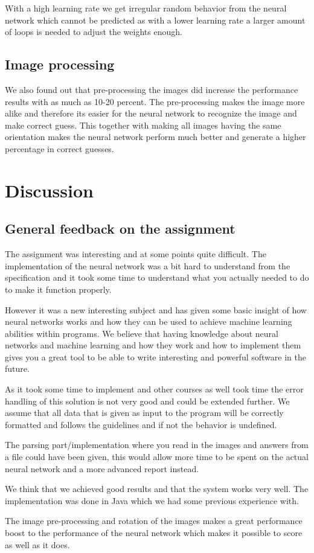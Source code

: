 \documentclass[a4paper, 12pt]{article}
\begin{document}
With a high learning rate we get irregular random behavior from the neural network which cannot be predicted as with a lower learning rate a larger amount of loops is needed to adjust the weights enough.

\subsection{Image processing}
We also found out that pre-processing the images did increase the performance results with as much as 10-20 percent. The pre-processing makes the image more alike and therefore its easier for the neural network to recognize the image and make correct guess. This together with making all images having the same orientation makes the neural network perform much better and generate a higher percentage in correct guesses.

\section{Discussion}
\subsection{General feedback on the assignment}
The assignment was interesting and at some points quite difficult. The implementation of the neural network was a bit hard to understand from the specification and it took some time to understand what you actually needed to do to make it function properly.

However it was a new interesting subject and has given some basic insight of how neural networks works and how they can be used to achieve machine learning abilities within programs. We believe that having knowledge about neural networks and machine learning and how they work and how to implement them gives you a great tool to be able to write interesting and powerful software in the future.

As it took some time to implement and other courses as well took time the error handling of this solution is not very good and could be extended further. We assume that all data that is given as input to the program will be correctly formatted and follows the guidelines and if not the behavior is undefined.

The parsing part/implementation where you read in the images and answers from a file could have been given, this would allow more time to be spent on the actual neural network and a more advanced report instead.

We think that we achieved good results and that the system works very well. The implementation was done in Java which we had some previous experience with.

The image pre-processing and rotation of the images makes a great performance boost to the performance of the neural network which makes it possible to score as well as it does.


\end{document}
